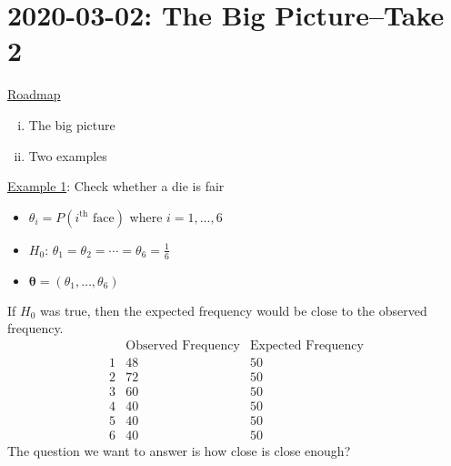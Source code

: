 \section{2020-03-02: The Big Picture--Take 2}
\underline{Roadmap}
\begin{enumerate}[(i)]
    \item The big picture
    \item Two examples
\end{enumerate}
\underline{Example 1}: Check whether a die is fair
\begin{itemize}
    \item $ \theta_i=P(i^{\text{th}} \text{ face}) $ where $ i=1,\ldots ,6 $
    \item $ H_0 $: $ \theta_1=\theta_2=\cdots=\theta_6=\frac{1}{6} $
    \item $ \bm{\theta}=(\theta_1,\ldots ,\theta_6) $
\end{itemize}
If $ H_0 $ was true, then the expected frequency would be close
to the observed frequency.
\[
    \begin{array}{c|c|c|}
          & \text{Observed Frequency} & \text{Expected Frequency} \\
        \hline
        1 & 48                        & 50                        \\
        2 & 72                        & 50                        \\
        3 & 60                        & 50                        \\
        4 & 40                        & 50                        \\
        5 & 40                        & 50                        \\
        6 & 40                        & 50
    \end{array}
\]
The question we want to answer is how close is close enough?

